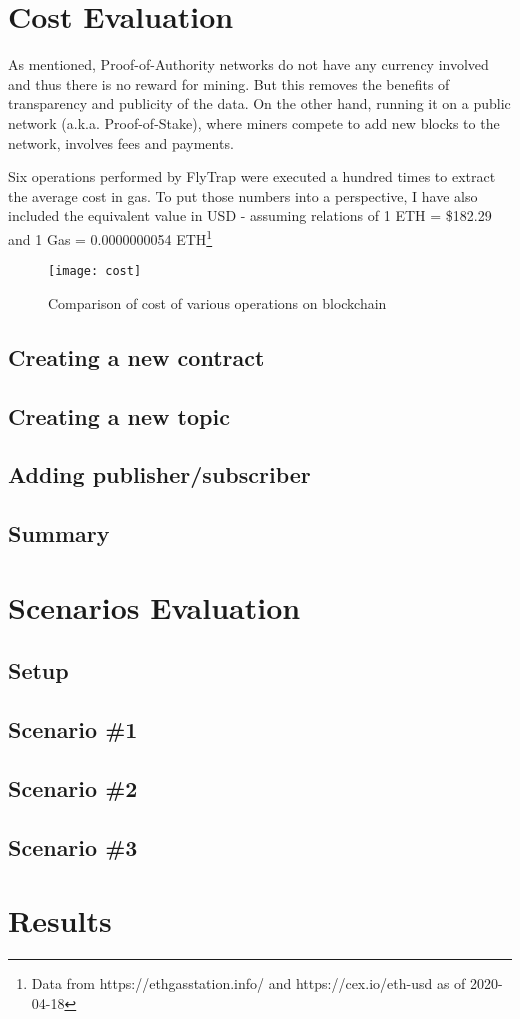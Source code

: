 \section{Cost Evaluation}
As mentioned, Proof-of-Authority networks do not have any currency involved and thus there is no reward for mining. But this removes the benefits of transparency and publicity of the data. On the other hand, running it on a public network (a.k.a. Proof-of-Stake), where miners compete to add new blocks to the network, involves fees and payments.

Six operations performed by FlyTrap were executed a hundred times to extract the average cost in gas. To put those numbers into a perspective, I have also included the equivalent value in USD - assuming relations of 1 ETH = \$182.29 and 1 Gas = 0.0000000054 ETH\footnote{Data from https://ethgasstation.info/ and https://cex.io/eth-usd as of 2020-04-18}

\begin{figure}[h]
    \centering
    \texttt{[image: cost]}
    \caption{Comparison of cost of various operations on blockchain}
    \label{fig:cost}
\end{figure}
\subsection{Creating a new contract}
\subsection{Creating a new topic}
\subsection{Adding publisher/subscriber}
\subsection{Summary}

\section{Scenarios Evaluation}
\subsection{Setup}
\subsection{Scenario \#1}
\subsection{Scenario \#2}
\subsection{Scenario \#3}

\section{Results}
